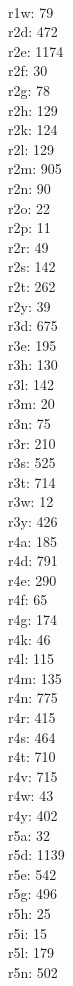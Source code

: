 \begin{multicols}{8}
  \\r1w: 79
  \\r2d: 472
  \\r2e: 1174
  \\r2f: 30
  \\r2g: 78
  \\r2h: 129
  \\r2k: 124
  \\r2l: 129
  \\r2m: 905
  \\r2n: 90
  \\r2o: 22
  \\r2p: 11
  \\r2r: 49
  \\r2s: 142
  \\r2t: 262
  \\r2y: 39
  \\r3d: 675
  \\r3e: 195
  \\r3h: 130
  \\r3l: 142
  \\r3m: 20
  \\r3n: 75
  \\r3r: 210
  \\r3s: 525
  \\r3t: 714
  \\r3w: 12
  \\r3y: 426
  \\r4a: 185
  \\r4d: 791
  \\r4e: 290
  \\r4f: 65
  \\r4g: 174
  \\r4k: 46
  \\r4l: 115
  \\r4m: 135
  \\r4n: 775
  \\r4r: 415
  \\r4s: 464
  \\r4t: 710
  \\r4v: 715
  \\r4w: 43
  \\r4y: 402
  \\r5a: 32
  \\r5d: 1139
  \\r5e: 542
  \\r5g: 496
  \\r5h: 25
  \\r5i: 15
  \\r5l: 179
  \\r5n: 502

\end{multicols}
